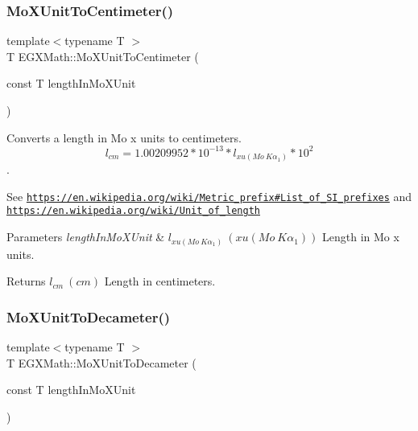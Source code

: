 \subsubsection{\texorpdfstring{Mo\+X\+Unit\+To\+Centimeter()}{MoXUnitToCentimeter()}}
{\footnotesize\ttfamily template$<$typename T $>$ \\
T E\+G\+X\+Math\+::\+Mo\+X\+Unit\+To\+Centimeter (\begin{DoxyParamCaption}\item[{const T}]{length\+In\+Mo\+X\+Unit }\end{DoxyParamCaption})}



Converts a length in Mo x units to centimeters. \[ l_{cm}=1.00209952*10^{-13} * l_{xu(Mo\ K\alpha_1)} * 10^{2} \]. 

See \href{https://en.wikipedia.org/wiki/Metric_prefix#List_of_SI_prefixes}{\tt https\+://en.\+wikipedia.\+org/wiki/\+Metric\+\_\+prefix\#\+List\+\_\+of\+\_\+\+S\+I\+\_\+prefixes} and \href{https://en.wikipedia.org/wiki/Unit_of_length}{\tt https\+://en.\+wikipedia.\+org/wiki/\+Unit\+\_\+of\+\_\+length} 
\begin{DoxyParams}{Parameters}
{\em length\+In\+Mo\+X\+Unit} & $ l_{xu(Mo\ K\alpha_1)}\ (xu(Mo\ K\alpha_1))$ Length in Mo x units. \\
\hline
\end{DoxyParams}
\begin{DoxyReturn}{Returns}
$ l_{cm}\ (cm)$ Length in centimeters. 
\end{DoxyReturn}
\mbox{\label{group___e_g_x_math-_conversions-_length_conversions-_non-_s_i-_mo_x_unit-_s_i_ga8062fcff8f184d57df1ba88c72902f0d}} 
\subsubsection{\texorpdfstring{Mo\+X\+Unit\+To\+Decameter()}{MoXUnitToDecameter()}}
{\footnotesize\ttfamily template$<$typename T $>$ \\
T E\+G\+X\+Math\+::\+Mo\+X\+Unit\+To\+Decameter (\begin{DoxyParamCaption}\item[{const T}]{length\+In\+Mo\+X\+Unit }\end{DoxyParamCaption})}



